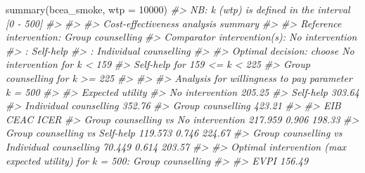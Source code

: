 \documentclass[
]{article}
\newenvironment{Shaded}{\begin{snugshade}}{\end{snugshade}}
\newcommand{\AttributeTok}[1]{\textcolor[rgb]{0.77,0.63,0.00}{#1}}
\newcommand{\CommentTok}[1]{\textcolor[rgb]{0.56,0.35,0.01}{\textit{#1}}}
\newcommand{\DecValTok}[1]{\textcolor[rgb]{0.00,0.00,0.81}{#1}}
\newcommand{\FunctionTok}[1]{\textcolor[rgb]{0.00,0.00,0.00}{#1}}
\newcommand{\NormalTok}[1]{#1}
\begin{document}
\begin{Shaded}
\begin{Highlighting}[]
\FunctionTok{summary}\NormalTok{(bcea\_smoke, }\AttributeTok{wtp =} \DecValTok{10000}\NormalTok{)}
\CommentTok{\#\textgreater{} NB: k (wtp) is defined in the interval [0 {-} 500]}
\CommentTok{\#\textgreater{} }
\CommentTok{\#\textgreater{} }
\CommentTok{\#\textgreater{} Cost{-}effectiveness analysis summary }
\CommentTok{\#\textgreater{} }
\CommentTok{\#\textgreater{} Reference intervention:  Group counselling}
\CommentTok{\#\textgreater{} Comparator intervention(s): No intervention}
\CommentTok{\#\textgreater{}                           : Self{-}help}
\CommentTok{\#\textgreater{}                           : Individual counselling}
\CommentTok{\#\textgreater{} }
\CommentTok{\#\textgreater{} Optimal decision: choose No intervention for k \textless{} 159}
\CommentTok{\#\textgreater{}                          Self{-}help for 159 \textless{}= k \textless{} 225}
\CommentTok{\#\textgreater{}                          Group counselling for k \textgreater{}= 225}
\CommentTok{\#\textgreater{} }
\CommentTok{\#\textgreater{} }
\CommentTok{\#\textgreater{} Analysis for willingness to pay parameter k = 500}
\CommentTok{\#\textgreater{} }
\CommentTok{\#\textgreater{}                        Expected utility}
\CommentTok{\#\textgreater{} No intervention                  205.25}
\CommentTok{\#\textgreater{} Self{-}help                        303.64}
\CommentTok{\#\textgreater{} Individual counselling           352.76}
\CommentTok{\#\textgreater{} Group counselling                423.21}
\CommentTok{\#\textgreater{} }
\CommentTok{\#\textgreater{}                                                 EIB  CEAC   ICER}
\CommentTok{\#\textgreater{} Group counselling vs No intervention        217.959 0.906 198.33}
\CommentTok{\#\textgreater{} Group counselling vs Self{-}help              119.573 0.746 224.67}
\CommentTok{\#\textgreater{} Group counselling vs Individual counselling  70.449 0.614 203.57}
\CommentTok{\#\textgreater{} }
\CommentTok{\#\textgreater{} Optimal intervention (max expected utility) for k = 500: Group counselling}
\CommentTok{\#\textgreater{}            }
\CommentTok{\#\textgreater{} EVPI 156.49}
\end{Highlighting}
\end{Shaded}
\end{document}
